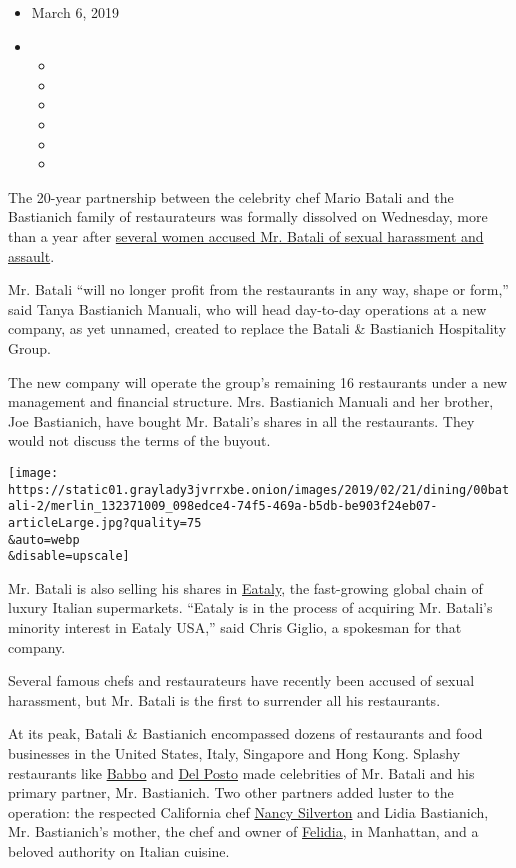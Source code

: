 \begin{itemize}
\item
  March 6, 2019
\item
  \begin{itemize}
  \item
  \item
  \item
  \item
  \item
  \item
  \end{itemize}
\end{itemize}

The 20-year partnership between the celebrity chef Mario Batali and the
Bastianich family of restaurateurs was formally dissolved on Wednesday,
more than a year after
\href{https://www.nytimes3xbfgragh.onion/2017/12/11/dining/mario-batali-sexual-misconduct.html}{several
women accused Mr. Batali of sexual harassment and assault}.

Mr. Batali ``will no longer profit from the restaurants in any way,
shape or form,'' said Tanya Bastianich Manuali, who will head day-to-day
operations at a new company, as yet unnamed, created to replace the
Batali \& Bastianich Hospitality Group.

The new company will operate the group's remaining 16 restaurants under
a new management and financial structure. Mrs. Bastianich Manuali and
her brother, Joe Bastianich, have bought Mr. Batali's shares in all the
restaurants. They would not discuss the terms of the buyout.

\texttt{[image: https://static01.graylady3jvrrxbe.onion/images/2019/02/21/dining/00batali-2/merlin\_132371009\_098edce4-74f5-469a-b5db-be903f24eb07-articleLarge.jpg?quality=75\\\&auto=webp\\\&disable=upscale]}

Mr. Batali is also selling his shares in
\href{https://www.eataly.com/}{Eataly}, the fast-growing global chain of
luxury Italian supermarkets. ``Eataly is in the process of acquiring Mr.
Batali's minority interest in Eataly USA,'' said Chris Giglio, a
spokesman for that company.

Several famous chefs and restaurateurs have recently been accused of
sexual harassment, but Mr. Batali is the first to surrender all his
restaurants.

At its peak, Batali \& Bastianich encompassed dozens of restaurants and
food businesses in the United States, Italy, Singapore and Hong Kong.
Splashy restaurants like
\href{https://www.nytimes3xbfgragh.onion/2017/04/04/dining/babbo-review-pete-wells.html}{Babbo}
and
\href{https://www.nytimes3xbfgragh.onion/2016/04/06/dining/del-posto-restaurant-luxury.html}{Del
Posto} made celebrities of Mr. Batali and his primary partner, Mr.
Bastianich. Two other partners added luster to the operation: the
respected California chef
\href{https://la.eater.com/2017/12/12/16764984/mario-batali-sexual-harassment-nancy-silverton-reaction-statement-mozza-restaurant-group}{Nancy
Silverton} and Lidia Bastianich, Mr. Bastianich's mother, the chef and
owner of
\href{https://www.google.com/search?q=felidia+nyc\&oq=Felidia+ny\&aqs=chrome.0.0j69i57j0l4.2886j0j7\&sourceid=chrome\&ie=UTF-8}{Felidia},
in Manhattan, and a beloved authority on Italian cuisine.

